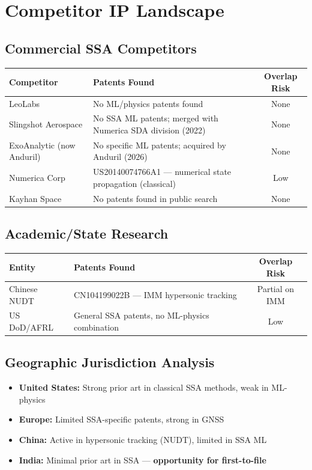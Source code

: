 \documentclass[11pt,a4paper]{article}
\begin{document}
\newpage

\section{Competitor IP Landscape}

\subsection{Commercial SSA Competitors}

\renewcommand{\arraystretch}{1.3}
\begin{tabularx}{\textwidth}{l Y c}
\toprule
\textbf{Competitor} & \textbf{Patents Found} & \textbf{Overlap Risk} \\
\midrule
LeoLabs & No ML/physics patents found & None \\
Slingshot Aerospace & No SSA ML patents; merged with Numerica SDA division (2022) & None \\
ExoAnalytic (now Anduril) & No specific ML patents; acquired by Anduril (2026) & None \\
Numerica Corp & US20140074766A1 — numerical state propagation (classical) & Low \\
Kayhan Space & No patents found in public search & None \\
\bottomrule
\end{tabularx}

\subsection{Academic/State Research}

\renewcommand{\arraystretch}{1.3}
\begin{tabularx}{\textwidth}{l Y c}
\toprule
\textbf{Entity} & \textbf{Patents Found} & \textbf{Overlap Risk} \\
\midrule
Chinese NUDT & CN104199022B — IMM hypersonic tracking & Partial on IMM \\
US DoD/AFRL & General SSA patents, no ML-physics combination & Low \\
\bottomrule
\end{tabularx}

\subsection{Geographic Jurisdiction Analysis}

\begin{itemize}
\item \textbf{United States:} Strong prior art in classical SSA methods, weak in ML-physics
\item \textbf{Europe:} Limited SSA-specific patents, strong in GNSS
\item \textbf{China:} Active in hypersonic tracking (NUDT), limited in SSA ML
\item \textbf{India:} Minimal prior art in SSA — \textbf{opportunity for first-to-file}
\end{itemize}
\end{document}
